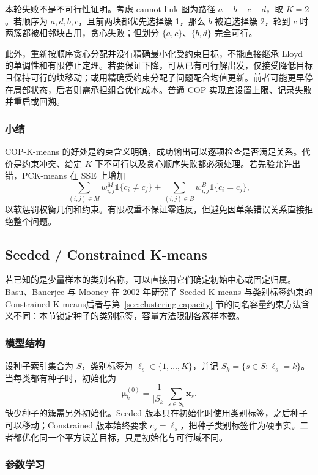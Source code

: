 本轮失败不是不可行性证明。考虑 cannot-link 图为路径 $a-b-c-d$，取 $K=2$。若顺序为 $a,d,b,c$，且前两块都优先选择簇 1，那么 $b$ 被迫选择簇 2，轮到 $c$ 时两簇都被相邻块占用，贪心失败；但划分 $\{a,c\}$、$\{b,d\}$ 完全可行。

此外，重新按顺序贪心分配并没有精确最小化受约束目标，不能直接继承 Lloyd 的单调性和有限停止定理。若要保证下降，可从已有可行解出发，仅接受降低目标且保持可行的块移动；或用精确受约束分配子问题配合均值更新。前者可能更早停在局部状态，后者则需承担组合优化成本。普通 COP 实现宜设置上限、记录失败并重启或回溯。

\subsubsection{小结}

COP-K-means 的好处是约束含义明确，成功输出可以逐项检查是否满足关系。代价是约束冲突、给定 $K$ 下不可行以及贪心顺序失败都必须处理。若先验允许出错，PCK-means 在 SSE 上增加
\[
 \sum_{(i,j)\in M}w_{i,j}^{M}\mathbb{1}\{c_i\ne c_j\}
 +\sum_{(i,j)\in B}w_{i,j}^{B}\mathbb{1}\{c_i=c_j\},
\]
以软惩罚权衡几何和约束。有限权重不保证零违反，但避免因单条错误关系直接拒绝整个问题。

\subsection{Seeded / Constrained K-means}
\label{sec:clustering-seeded}

若已知的是少量样本的类别名称，可以直接用它们确定初始中心或固定归属。Basu、Banerjee 与 Mooney 在 2002 年研究了 Seeded K-means 与类别标签约束的 Constrained K-means后者与第~\ref{sec:clustering-capacity} 节的同名容量约束方法含义不同：本节锁定种子的类别标签，容量方法限制各簇样本数。

\subsubsection{模型结构}

设种子索引集合为 $S$，类别标签为 $\ell_s\in\{1,\ldots,K\}$，并记 $S_k=\{s\in S:\ell_s=k\}$。当每类都有种子时，初始化为
\[
 \bm{\mu}_k^{(0)}
 =\frac{1}{|S_k|}\sum_{s\in S_k}\bm{x}_s.
\]
缺少种子的簇需另外初始化。Seeded 版本只在初始化时使用类别标签，之后种子可以移动；Constrained 版本始终要求 $c_s=\ell_s$，把种子类别标签作为硬事实。二者都优化同一个平方误差目标，只是初始化与可行域不同。

\subsubsection{参数学习}

